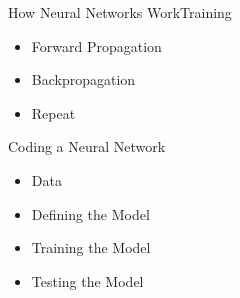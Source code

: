 \documentclass{beamer}
\begin{document}
\begin{frame}{How Neural Networks Work}{Training}
    \begin{itemize}
        \item Forward Propagation
        \item Backpropagation
        \item Repeat
    \end{itemize}
\end{frame}

\begin{frame}{Coding a Neural Network}
    \begin{itemize}
        \item Data
        \item Defining the Model
        \item Training the Model
        \item Testing the Model
    \end{itemize}
\end{frame}
\end{document}
